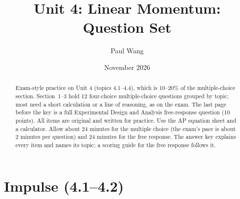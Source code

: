 \documentclass[11pt]{article}
\title{Unit 4: Linear Momentum: Question Set}
\author{Paul Wang}
\date{November 2026}
\begin{document}
\maketitle

\begin{abstract}
Exam-style practice on Unit 4 (topics 4.1--4.4), which is 10--20\% of the multiple-choice section. Section~1--3 hold 12 four-choice multiple-choice questions grouped by topic; most need a short calculation or a line of reasoning, as on the exam. The last page before the key is a full Experimental Design and Analysis free-response question (10 points). All items are original and written for practice. Use the AP equation sheet and a calculator. Allow about 24 minutes for the multiple choice (the exam's pace is about 2 minutes per question) and 24 minutes for the free response. The answer key explains every item and names its topic; a scoring guide for the free response follows it.
\end{abstract}


\section{Impulse (4.1--4.2)}
\end{document}
